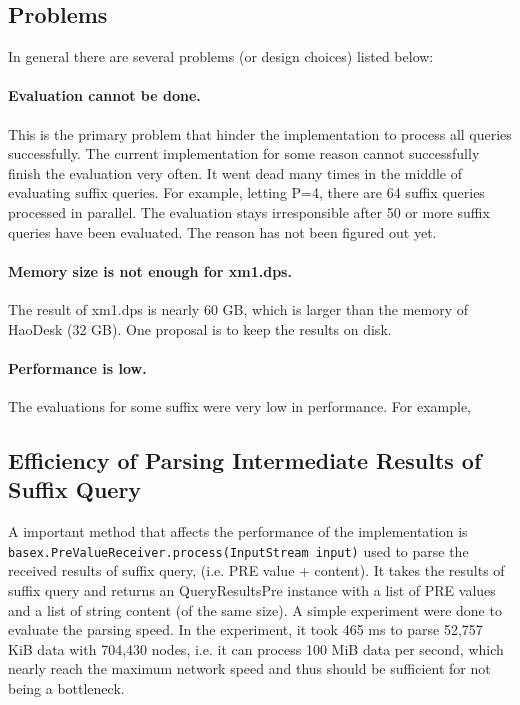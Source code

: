 


\subsection{Problems}

In general there are several problems (or design choices) listed below:

\paragraph{Evaluation cannot be done.}

This is the primary problem that hinder the implementation to process
all queries successfully.
The current implementation for some reason cannot successfully finish
the evaluation very often. It went dead many times in the middle of
evaluating suffix queries. For example, letting P=4, there are 64 suffix
queries processed in parallel. The evaluation stays irresponsible after
50 or more suffix queries have been evaluated. The reason has not been
figured out yet.

\paragraph{Memory size is not enough for xm1.dps.}
The result of xm1.dps is nearly 60 GB, which is larger than the memory
of HaoDesk (32 GB). One proposal is to keep the results on disk.


\paragraph{Performance is low.}
The evaluations for some suffix were very low in performance.
For example, 




\subsection{Efficiency of Parsing Intermediate Results of Suffix Query}

A important method that affects the performance of the implementation is
\texttt{basex.PreValueReceiver.process(InputStream input)} used
to parse the received results of suffix query, (i.e. PRE value +
content). It takes the results of suffix query and returns an
QueryResultsPre instance with a list of PRE values and a list of
string content (of the same size). A simple experiment were done to evaluate
the parsing speed. In the experiment, it took 465 ms to parse
52,757 KiB data with 704,430 nodes, i.e. it can process 100 MiB
data per second, which nearly reach the maximum network
speed and thus should be sufficient for not being a bottleneck.






